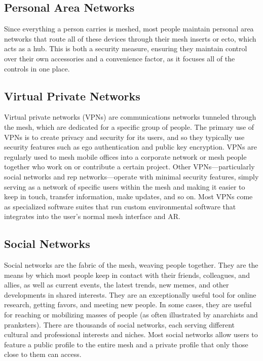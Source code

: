 \subsection{Personal Area Networks}

Since everything a person carries is meshed, most 
people maintain personal area networks that route 
all of these devices through their mesh inserts or ecto, 
which acts as a hub. This is both a security measure, 
ensuring they maintain control over their own accessories
and a convenience factor, as it focuses all of the
controls in one place.

\subsection{Virtual Private Networks}

Virtual private networks (VPNs) are communications
networks tunneled through the mesh, which
are dedicated for a specific group of people. The 
primary use of VPNs is to create privacy and security
for its users, and so they typically use security
features such as ego authentication and public key 
encryption. VPNs are regularly used to mesh mobile 
offices into a corporate network or mesh people together
who work on or contribute a certain project.
Other VPNs—particularly social networks and rep 
networks—operate with minimal security features, 
simply serving as a network of specific users within 
the mesh and making it easier to keep in touch, 
transfer information, make updates, and so on. Most 
VPNs come as specialized software suites that run 
custom environmental software that integrates into 
the user's normal mesh interface and AR.

\subsection{Social Networks}

Social networks are the fabric of the mesh, weaving 
people together. They are the means by which most 
people keep in contact with their friends, colleagues, 
and allies, as well as current events, the latest trends, 
new memes, and other developments in shared 
interests. They are an exceptionally useful tool for 
online research, getting favors, and meeting new 
people. In some cases, they are useful for reaching 
or mobilizing masses of people (as often illustrated 
by anarchists and pranksters). There are thousands 
of social networks, each serving different cultural 
and professional interests and niches. Most social 
networks allow users to feature a public profile to 
the entire mesh and a private profile that only those 
close to them can access.

